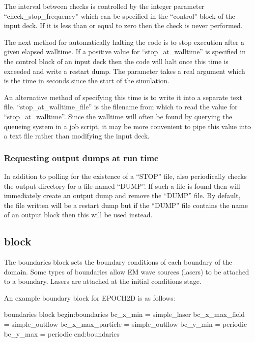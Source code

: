 The interval between checks is controlled by the integer parameter
``check\_stop\_frequency'' which can be specified in the ``control''
block of the input deck. If it is less than or equal to zero then
the check is never performed.

The next method for automatically halting the code is to stop execution after
a given elapsed walltime.
If a positive value for ``stop\_at\_walltime'' is specified in the
control block of an input deck then the code will halt once this
time is exceeded and write a restart dump. The parameter takes a real
argument which is the time in seconds since the start of the simulation.

An alternative method of specifying this time is to write it into a separate
text file. ``stop\_at\_walltime\_file'' is the filename from which to read the
value for ``stop\_at\_walltime''. Since the walltime will often be
found by querying the queueing system in a job script, it may be
more convenient to pipe this value into a text file rather than
modifying the input deck.

\subsubsection{Requesting output dumps at run time}
\label{sec:dump_request}
In addition to polling for the existence of a ``STOP'' file, {\EPOCH} also
periodically checks the output directory for a file named ``DUMP''. If such
a file is found then {\EPOCH} will immediately create an output dump and
remove the ``DUMP'' file. By default, the file written will be a restart
dump but if the ``DUMP'' file contains the name of an output block then this
will be used instead.


\subsection{\texorpdfstring
  { block}
  {           {boundaries} block}}
\label{sec:boundaries_block}
The {\emphtext boundaries} block sets the boundary conditions of each boundary
of the domain. Some types of boundaries allow EM wave sources (lasers) to be
attached to a boundary. Lasers are attached at the initial conditions
stage.

An example boundary block for EPOCH2D is as follows:
\begin{lboxverbatim}{boundaries block}
begin:boundaries
   bc_x_min = simple_laser
   bc_x_max_field = simple_outflow
   bc_x_max_particle = simple_outflow
   bc_y_min = periodic
   bc_y_max = periodic
end:boundaries
\end{lboxverbatim}

